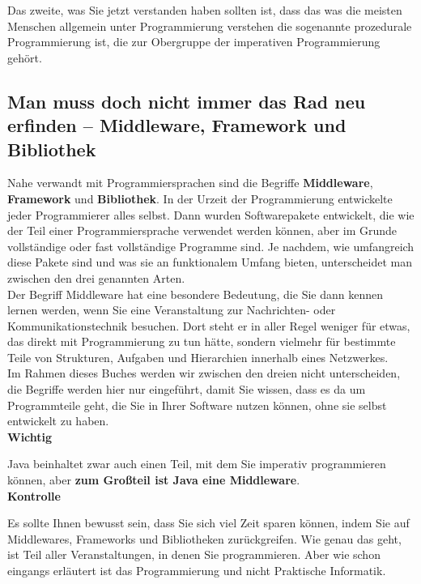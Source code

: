 Das zweite, was Sie jetzt verstanden haben sollten ist, dass das was die meisten Menschen allgemein unter Programmierung verstehen die sogenannte prozedurale Programmierung ist, die zur Obergruppe der imperativen Programmierung gehört.

\subsection[Middleware, Framework, Bibliothek]{Man muss doch nicht immer das Rad neu erfinden – Middleware, Framework und Bibliothek}

Nahe verwandt mit Programmiersprachen sind die Begriffe \textbf{Middleware}, \textbf{Framework} und \textbf{Bibliothek}. In der Urzeit der Programmierung entwickelte jeder Programmierer alles selbst. Dann wurden Softwarepakete entwickelt, die wie der Teil einer Programmiersprache verwendet werden können, aber im Grunde vollständige oder fast vollständige Programme sind. Je nachdem, wie umfangreich diese Pakete sind und was sie an funktionalem Umfang bieten, unterscheidet man zwischen den drei genannten Arten.\\

Der Begriff Middleware hat eine besondere Bedeutung, die Sie dann kennen lernen werden, wenn Sie eine Veranstaltung zur Nachrichten- oder Kommunikationstechnik besuchen. Dort steht er in aller Regel weniger für etwas, das direkt mit Programmierung zu tun hätte, sondern vielmehr für bestimmte Teile von Strukturen, Aufgaben und Hierarchien innerhalb eines Netzwerkes.\\

Im Rahmen dieses Buches werden wir zwischen den dreien nicht unterscheiden, die Begriffe werden hier nur eingeführt, damit Sie wissen, dass es da um Programmteile geht, die Sie in Ihrer Software nutzen können, ohne sie selbst entwickelt zu haben.\\

\textbf{Wichtig}

Java beinhaltet zwar auch einen Teil, mit dem Sie imperativ programmieren können, aber \textbf{zum Großteil ist Java eine Middleware}. \\

\textbf{Kontrolle}

Es sollte Ihnen bewusst sein, dass Sie sich viel Zeit sparen können, indem Sie auf Middlewares, Frameworks und Bibliotheken zurückgreifen. Wie genau das geht, ist Teil aller Veranstaltungen, in denen Sie programmieren. Aber wie schon eingangs erläutert ist das Programmierung und nicht Praktische Informatik.

